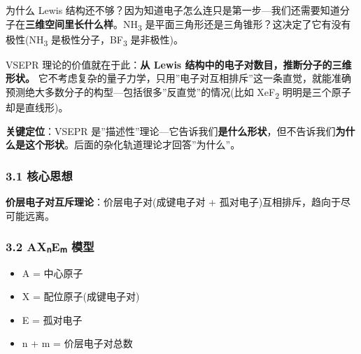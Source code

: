 \documentclass[a4paper,11pt]{ctexart}
\providecommand{\tightlist}{\setlength{\itemsep}{0pt}\setlength{\parskip}{0pt}}
\newcommand{\箭}{\ensuremath{\rightarrow}}
\newcommand{\左箭}{\ensuremath{\leftarrow}}
\newcommand{\上箭}{\ensuremath{\uparrow}}
\newcommand{\下箭}{\ensuremath{\downarrow}}
\newcommand{\衡}{\ensuremath{\rightleftharpoons}}
\newcommand{\双箭}{\ensuremath{\leftrightarrow}}
\newcommand{\约等于}{\ensuremath{\approx}}
\newcommand{\小于等于}{\ensuremath{\leq}}
\newcommand{\大于等于}{\ensuremath{\geq}}
\newcommand{\不等于}{\ensuremath{\neq}}
\newcommand{\西格马}{\ensuremath{\sigma}}
\newcommand{\派}{\ensuremath{\pi}}
\begin{document}
为什么 Lewis 结构还不够？因为知道电子怎么连只是第一步---我们还需要知道分子在\textbf{三维空间里长什么样}。NH\textsubscript{3} 是平面三角形还是三角锥形？这决定了它有没有极性(NH\textsubscript{3} 是极性分子，BF\textsubscript{3} 是非极性)。

VSEPR 理论的价值就在于此：\textbf{从 Lewis 结构中的电子对数目，推断分子的三维形状。} 它不考虑复杂的量子力学，只用''电子对互相排斥''这一条直觉，就能准确预测绝大多数分子的构型---包括很多''反直觉''的情况(比如 XeF\textsubscript{2} 明明是三个原子却是直线形)。

\textbf{关键定位}：VSEPR 是''描述性''理论---它告诉我们\textbf{是什么形状}，但不告诉我们\textbf{为什么是这个形状}。后面的杂化轨道理论才回答''为什么''。

\subsubsection{3.1 核心思想}\label{ux6838ux5fc3ux601dux60f3}

\textbf{价层电子对互斥理论}：价层电子对(成键电子对 + 孤对电子)互相排斥，趋向于尽可能远离。

\subsubsection{3.2 AXₙEₘ 模型}\label{axux2099eux2098-ux6a21ux578b}

\begin{itemize}
\tightlist
\item
  A = 中心原子
\item
  X = 配位原子(成键电子对)
\item
  E = 孤对电子
\item
  n + m = 价层电子对总数
\end{itemize}
\end{document}
